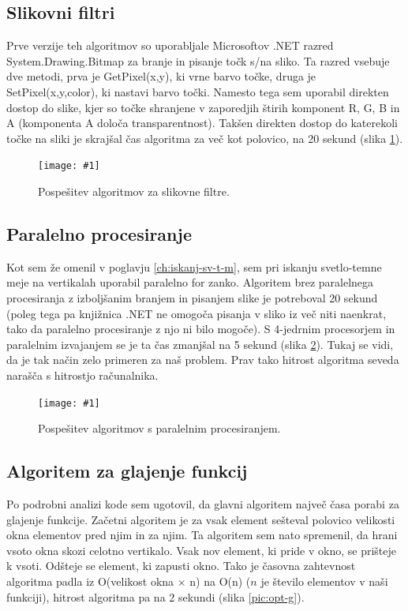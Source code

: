 \documentclass[oneside, a4paper, 12pt]{book}
\newcommand{\slika}[3]{
	\begin{figure}
	\begin{center}
	\texttt{[image: \#1]}
	\end{center}
	\vspace{-20pt}
	\caption{#2}
	\label{#3}
	\end{figure}
}
\begin{document}
\subsection{Slikovni filtri}
Prve verzije teh algoritmov so uporabljale Microsoftov .NET razred 
System.\-Drawing.\-Bitmap za branje in pisanje točk s/na sliko. Ta 
razred vsebuje dve metodi, prva je GetPixel(x,y), ki vrne barvo točke, 
druga je SetPixel(x,y,color), ki nastavi barvo točki. Namesto tega sem 
uporabil direkten dostop do slike, kjer so točke shranjene v zaporedjih 
štirih komponent R, G, B in A (komponenta A določa transparentnost). 
Takšen direkten dostop do katerekoli točke na sliki je skrajšal čas 
algoritma za več kot polovico, na 20 sekund (slika \ref{pic:opt-sf}).

\slika{slike/optimizacija_grafi/optimizacija-slikovnih-filtrov.jpg}
{Pospešitev algoritmov za slikovne filtre.}{pic:opt-sf}

\subsection{Paralelno procesiranje}
Kot sem že omenil v poglavju \ref{ch:iskanj-sv-t-m}, sem pri iskanju 
svetlo-temne meje na vertikalah uporabil paralelno for zanko. Algoritem 
brez paralelnega procesiranja z izboljšanim branjem in pisanjem slike 
je potreboval 20 sekund (poleg tega pa knjižnica .NET ne omogoča pisanja 
v sliko iz več niti naenkrat, tako da paralelno procesiranje z njo ni 
bilo mogoče). S 4-jedrnim procesorjem in paralelnim izvajanjem se je 
ta čas zmanjšal na 5 sekund (slika \ref{pic:opt-p}). Tukaj se vidi, da 
je tak način zelo primeren za naš problem. Prav tako hitrost algoritma 
seveda narašča s hitrostjo računalnika.


\slika{slike/optimizacija_grafi/optimizacija-s-paralelnim-procesiranjem.jpg}
{Pospešitev algoritmov s paralelnim procesiranjem.}{pic:opt-p}

\subsection{Algoritem za glajenje funkcij}
Po podrobni analizi kode sem ugotovil, da glavni algoritem največ 
časa porabi za glajenje funkcije. Začetni algoritem je za vsak 
element sešteval polovico velikosti okna elementov pred njim in 
za njim. Ta algoritem sem nato spremenil, da hrani vsoto okna skozi 
celotno vertikalo. Vsak nov element, ki pride v okno, se prišteje k 
vsoti. Odšteje se element, ki zapusti okno. Tako je časovna zahtevnost 
algoritma padla iz O(velikost okna $\times$ n) na O(n) ($n$ je število 
elementov v naši funkciji), hitrost algoritma pa na 2 sekundi (slika 
\ref{pic:opt-g}).
\end{document}
